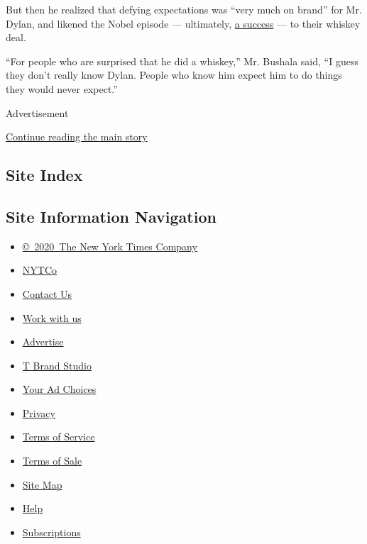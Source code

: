 But then he realized that defying expectations was ``very much on
brand'' for Mr. Dylan, and likened the Nobel episode --- ultimately,
\href{https://www.nytimes3xbfgragh.onion/2016/12/10/arts/bob-dylan-skips-nobel-prize-ceremonies.html}{a
success} --- to their whiskey deal.

``For people who are surprised that he did a whiskey,'' Mr. Bushala
said, ``I guess they don't really know Dylan. People who know him expect
him to do things they would never expect.''

Advertisement

\protect\hyperlink{after-bottom}{Continue reading the main story}

\hypertarget{site-index}{%
\subsection{Site Index}\label{site-index}}

\hypertarget{site-information-navigation}{%
\subsection{Site Information
Navigation}\label{site-information-navigation}}

\begin{itemize}
\tightlist
\item
  \href{https://help.nytimes3xbfgragh.onion/hc/en-us/articles/115014792127-Copyright-notice}{©~2020~The
  New York Times Company}
\end{itemize}

\begin{itemize}
\tightlist
\item
  \href{https://www.nytco.com/}{NYTCo}
\item
  \href{https://help.nytimes3xbfgragh.onion/hc/en-us/articles/115015385887-Contact-Us}{Contact
  Us}
\item
  \href{https://www.nytco.com/careers/}{Work with us}
\item
  \href{https://nytmediakit.com/}{Advertise}
\item
  \href{http://www.tbrandstudio.com/}{T Brand Studio}
\item
  \href{https://www.nytimes3xbfgragh.onion/privacy/cookie-policy\#how-do-i-manage-trackers}{Your
  Ad Choices}
\item
  \href{https://www.nytimes3xbfgragh.onion/privacy}{Privacy}
\item
  \href{https://help.nytimes3xbfgragh.onion/hc/en-us/articles/115014893428-Terms-of-service}{Terms
  of Service}
\item
  \href{https://help.nytimes3xbfgragh.onion/hc/en-us/articles/115014893968-Terms-of-sale}{Terms
  of Sale}
\item
  \href{https://spiderbites.nytimes3xbfgragh.onion}{Site Map}
\item
  \href{https://help.nytimes3xbfgragh.onion/hc/en-us}{Help}
\item
  \href{https://www.nytimes3xbfgragh.onion/subscription?campaignId=37WXW}{Subscriptions}
\end{itemize}
